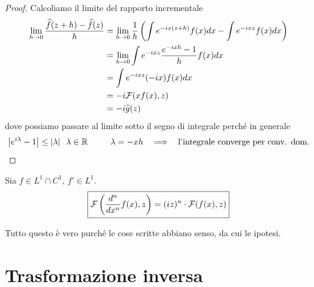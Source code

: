 \begin{proof}

Calcoliamo il limite del rapporto incrementale
\begin{align*}
\lim\limits_{h\rightarrow 0}\frac{\widehat{f}(z + h) - \widehat{f}(z)}{h} & = \lim\limits_{h\rightarrow 0}\frac{1}{h}\left(\int e^{- ix(z + h)} f(x) dx - \int e^{- ixz} f(x) dx\right)\\
 & = \lim\limits_{h\rightarrow 0}\int e^{- ixz}\frac{e^{- ixh} - 1}{h} f(x) dx\\
 & = \int e^{- ixz}(- ix) f(x) dx\\
 & = - i\mathcal{F}(xf(x), z)\\
 & = - i\widehat{g}(z)
\end{align*}
dove possiamo passare al limite sotto il segno di integrale perché in generale
\begin{equation*}
\left| e^{i\lambda} - 1\right| \leq | \lambda | \ \ \lambda \in \RR \ \ \ \ \ \ \ \ \lambda = - xh\ \ \implies \ \ \text{l'integrale converge per conv. dom.}
\end{equation*}
\end{proof}
\begin{thm}
Sia $f\in L^{1} \cap C^{1}$, $f'\in L^{1}$.
\begin{equation*}
\boxed{\mathcal{F}\left(\frac{d^{n}}{dx^{n}} f(x), z\right) = (iz)^{n} \cdot \mathcal{F}(f(x), z)}
\end{equation*}
\end{thm}
Tutto questo è vero purché le cose scritte abbiano senso, da cui le ipotesi.

\section{Trasformazione inversa}

